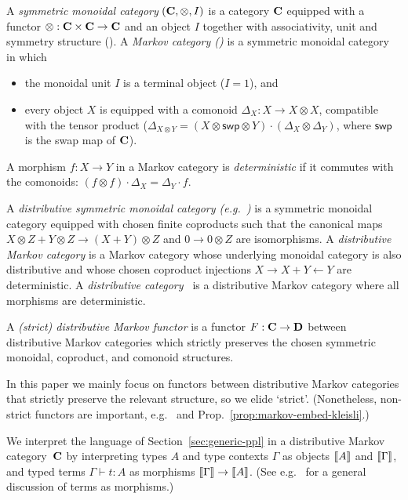 \begin{definition}\label{def:distr-markov}
  A \emph{symmetric monoidal category} $(\mathbf{C},\otimes,I)$ is
  a category $\mathbf{C}$ equipped with a functor ${\otimes :\mathbf{C}\times \mathbf{C} \to\mathbf{C}}$ and an object
  $I$ together with associativity, unit and symmetry structure (\cite[XI.1.]{maclane}).
  A \emph{Markov category (\cite{fritz})} is a symmetric monoidal category in which
  \begin{itemize}
  \item the monoidal unit $I$ is a terminal object ($I=1$), and
  \item 
    every object $X$ is equipped with a comonoid $\Delta_X:X\to X\otimes X$,
    compatible with the tensor product ($\Delta_{X\otimes Y}=(X\otimes\mathsf{swp}\otimes Y)\cdot (\Delta_X\otimes \Delta_Y)$, where $\mathsf{swp}$ is the swap map of $\mathbf{C}$). 
  \end{itemize}
  A morphism $f\colon X\to Y$ in a Markov category is
  \emph{deterministic} if it commutes with the comonoids:
  $(f\otimes f)\cdot \Delta_X=\Delta_Y\cdot f$. 

  A \emph{distributive symmetric monoidal category (e.g.~\cite{walters,jay-distr-monoidal})} is a symmetric monoidal category equipped with chosen finite coproducts such that
  the canonical maps $X\otimes Z + Y\otimes Z\to (X+Y)\otimes Z$
    and $0\to 0\otimes Z$ are isomorphisms.
  A \emph{distributive Markov category} is a Markov category whose
  underlying monoidal category is also distributive and
  whose chosen coproduct injections $X\to X+Y\leftarrow Y$ are
  deterministic.
  A \emph{distributive category~\cite{clw,cockett-distr}} is a distributive Markov category
  where all morphisms are deterministic.
  
  A \emph{(strict) distributive Markov functor} is a functor $F : \mathbf{C} \to \mathbf{D}$ between distributive Markov categories which strictly preserves the chosen symmetric monoidal, coproduct, and comonoid structures.
\end{definition}
In this paper we mainly focus on functors between distributive Markov
categories that strictly preserve the relevant structure, so we elide
`strict'. (Nonetheless, non-strict functors are important,
e.g.~\cite[\S10.2]{fritz} and Prop.~\ref{prop:markov-embed-kleisli}.)

We interpret the language of Section~\ref{sec:generic-ppl} in a
distributive Markov category~$\mathbf{C}$ by interpreting types $A$ and
type contexts $\Gamma$ as objects $\llbracket A\rrbracket$ and $\llbracket \Gamma\rrbracket$, and
typed terms $\Gamma\vdash t :A $ as morphisms $\llbracket \Gamma\rrbracket\to \llbracket A\rrbracket$.
(See e.g.~\cite{pitts-cat-logic} for a general discussion of terms
as morphisms.) 

